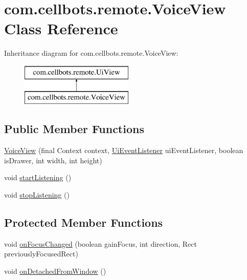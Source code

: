 \hypertarget{classcom_1_1cellbots_1_1remote_1_1_voice_view}{\section{com.\-cellbots.\-remote.\-Voice\-View Class Reference}
\label{classcom_1_1cellbots_1_1remote_1_1_voice_view}
}
Inheritance diagram for com.\-cellbots.\-remote.\-Voice\-View\-:\begin{figure}[H]
\begin{center}
\leavevmode
\includegraphics[height=2.000000cm]{classcom_1_1cellbots_1_1remote_1_1_voice_view}
\end{center}
\end{figure}
\subsection*{Public Member Functions}
\begin{DoxyCompactItemize}
\item 
\hyperlink{classcom_1_1cellbots_1_1remote_1_1_voice_view_a5a94be91fef4f2cae6acf323701f962c}{Voice\-View} (final Context context, \hyperlink{interfacecom_1_1cellbots_1_1remote_1_1_ui_view_1_1_ui_event_listener}{Ui\-Event\-Listener} ui\-Event\-Listener, boolean is\-Drawer, int width, int height)
\item 
void \hyperlink{classcom_1_1cellbots_1_1remote_1_1_voice_view_aad770b71e3f372830ea4d6ce5596ce8b}{start\-Listening} ()
\item 
void \hyperlink{classcom_1_1cellbots_1_1remote_1_1_voice_view_a647c98fc8ce21be766955c7979ea61c3}{stop\-Listening} ()
\end{DoxyCompactItemize}
\subsection*{Protected Member Functions}
\begin{DoxyCompactItemize}
\item 
void \hyperlink{classcom_1_1cellbots_1_1remote_1_1_voice_view_aa9d1a004bdd5020a2cffa1717f269138}{on\-Focus\-Changed} (boolean gain\-Focus, int direction, Rect previously\-Focused\-Rect)
\item 
void \hyperlink{classcom_1_1cellbots_1_1remote_1_1_voice_view_aeadc8b0198ec5d9a47a57c73020a0577}{on\-Detached\-From\-Window} ()
\end{DoxyCompactItemize}


